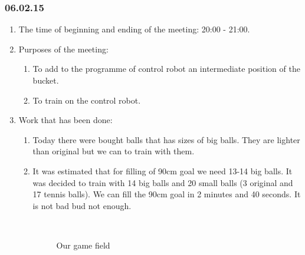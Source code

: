 \subsubsection{06.02.15}
\begin{enumerate}
	
	\item The time of beginning and ending of the meeting: 20:00 - 21:00.
	
	\item Purposes of the meeting: 
	\begin{enumerate}
		
		\item To add to the programme of control robot an intermediate position of the bucket.
		
		\item To train on the control robot.
		
	\end{enumerate}

	\item Work that has been done:
	\begin{enumerate}
		
		\item Today there were bought balls that has sizes of big balls. They are lighter than original but we can to train with them.
		
		\item It was estimated that for filling of 90cm goal we need 13-14 big balls. It was decided to train with 14 big balls and 20 small balls (3 original and 17 tennis balls). We can fill the 90cm goal in 2 minutes and 40 seconds. It is not bad bud not enough.
		\begin{figure}[H]
			\begin{minipage}[h]{0.2\linewidth}
				\center  
			\end{minipage}
			\begin{minipage}[h]{0.6\linewidth}
				\caption{Our game field}
			\end{minipage}
		\end{figure}
		

\end{enumerate}
\end{enumerate}
